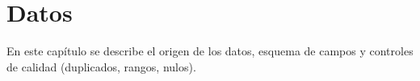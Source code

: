 \chapter{Datos}\label{chap:datos}

En este capítulo se describe el origen de los datos, esquema de campos y controles de calidad (duplicados, rangos, nulos).
